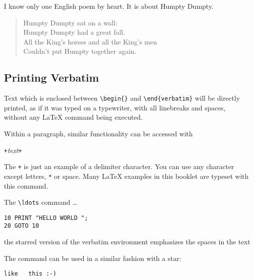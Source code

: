 \begin{example}
I know only one English poem by 
heart. It is about Humpty Dumpty.
\begin{flushleft}
\begin{verse}
Humpty Dumpty sat on a wall:\\
Humpty Dumpty had a great fall.\\ 
All the King's horses and all
the King's men\\
Couldn't put Humpty together
again.
\end{verse}
\end{flushleft}
\end{example}

\subsection{Printing Verbatim}

Text which is enclosed between \verb|\begin{|\verb|}| and
\verb|\end{verbatim}| will be directly printed, as if it was typed on a
typewriter, with all linebreaks and spaces, without any \LaTeX{}
command being executed.

Within a paragraph, similar functionality can be accessed with
\begin{command}
\verb|+|\emph{text}\verb|+|
\end{command}
\noindent The \verb|+| is just an example of a delimiter character. You can use any
character except letters, \verb|*| or space. Many \LaTeX{} examples in this
booklet are typeset with this command.

\begin{example}
The \verb|\ldots| command \ldots

\begin{verbatim}
10 PRINT "HELLO WORLD ";
20 GOTO 10
\end{verbatim}
\end{example}

\begin{example}
\begin{verbatim*}
the starred version of
the      verbatim   
environment emphasizes
the spaces   in the text
\end{verbatim*}
\end{example}

The  command can be used in a similar fashion with a star:

\begin{example}
\verb*|like   this :-) |
\end{example}

